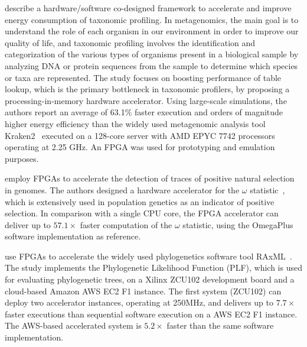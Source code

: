 \citet{Shahroodi2022KrakenOnMem:Profiling} describe a hardware/software co-designed framework to accelerate and improve energy consumption of taxonomic profiling. In metagenomics, the main goal is to understand the role of each organism in our environment in order to
improve our quality of life, and taxonomic profiling involves the identification and categorization of the various types of organisms present in a biological sample by analyzing DNA or protein sequences from the sample to determine which species or taxa are represented. The study focuses on boosting performance of table lookup, which is the primary bottleneck in taxonomic profilers, by proposing a processing-in-memory hardware accelerator. Using large-scale simulations, the authors report an average of 63.1\% faster execution and orders of magnitude higher energy efficiency than the  widely used metagenomic analysis tool Kraken2~\cite{wood2019improved} executed on a 128-core server with AMD EPYC 7742 processors  operating at 2.25 GHz. An FPGA was used for prototyping and emulation purposes.

\citet{Corts2022AcceleratedFPGAs} employ FPGAs to accelerate the detection of traces of positive natural selection in genomes. The authors designed a hardware accelerator for the $\omega$ statistic~\cite{kim2004linkage}, which is extensively used in population genetics as an indicator of positive selection. In comparison with a single CPU core,
the FPGA accelerator can deliver up to $57.1\times$ faster
computation of the $\omega$ statistic, using the OmegaPlus~\cite{alachiotis2012omegaplus} software implementation as reference.





\citet{Malakonakis2020ExploringRAxML} use FPGAs to accelerate the widely used phylogenetics software tool RAxML~\cite{stamatakis2014raxml}. The study implements the Phylogenetic Likelihood Function (PLF), which is used for evaluating phylogenetic trees, on a Xilinx ZCU102 development board and a cloud-based Amazon AWS EC2 F1 instance. The first system (ZCU102) can deploy two accelerator instances, operating at 250MHz, and delivers up to $7.7\times$ faster executions than sequential software execution on a AWS EC2 F1 instance. %
The AWS-based accelerated system is $5.2\times$ faster than the same software implementation. %



